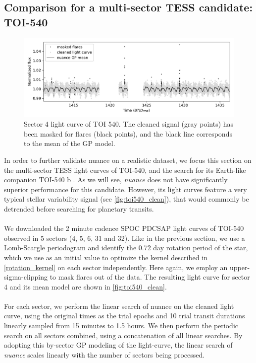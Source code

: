 \documentclass[modern,linenumbers]{aastex631}
\newcommand{\nuancemethod}{\textit{nuance}}
\newcommand{\nuance}{\nuancemethod{}}
\newcommand{\review}[1]{#1}
\begin{document}
\subsection{Comparison for a multi-sector TESS candidate: TOI-540}\label{toi540}
\begin{figure}[H]
    \begin{centering}
        \includegraphics[width=\linewidth]{../workflows/comparison_toi/figures/TOI 540/4.pdf}
        \caption{Sector 4 light curve of TOI 540. The cleaned signal (gray points) has been masked for flares (black points), and the black line corresponds to the mean of the GP model.}
        \label{fig:toi540_clean}
    \end{centering}
\end{figure}
In order to further validate nuance on a realistic dataset, we focus this section on the multi-sector TESS light curves of TOI-540, and the search for its Earth-like companion TOI-540 b \citep{TOI540}. \review{As we will see, \nuancemethod{} does not have significantly superior performance for this candidate. However, its light curves feature a very typical stellar variability signal (see \autoref{fig:toi540_clean}), that would commonly be detrended before searching for planetary transits}.\\\\
We downloaded the 2 minute cadence SPOC PDCSAP light curves of TOI-540 observed in 5 sectors (4, 5, 6, 31 and 32). Like in the previous section, we use a Lomb-Scargle periodogram and identify the 0.72 day rotation period of the star, which we use as an initial value to optimize the kernel described in \autoref{rotation_kernel} on each sector independently. Here again, we employ an upper-sigma-clipping to mask flares out of the data. The resulting light curve for sector 4 and its mean model are shown in \autoref{fig:toi540_clean}.\\\\
For each sector, we perform the linear search of nuance on the cleaned light curve, using the original times as the trial epochs and 10 trial transit durations linearly sampled from 15 minutes to 1.5 hours. We then perform the periodic search on all sectors combined, using a concatenation of all linear searches. By adopting this by-sector GP modeling of the light-curve, the linear search of \nuance{} scales linearly with the number of sectors being processed.
\end{document}
